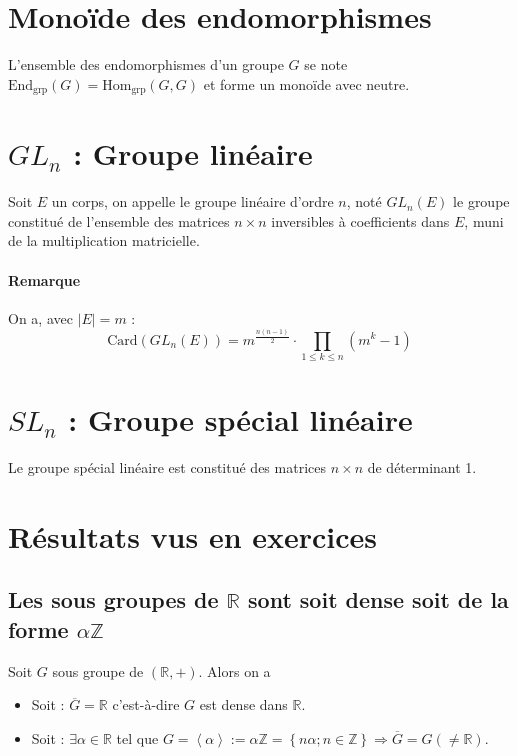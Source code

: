 \documentclass[a4paper,10pt]{report}
\newcommand{\grp}[1]{\left\langle #1 \right\rangle} %
\newcommand{\set}[1]{\left\lbrace #1 \right\rbrace } %
\newcommand{\IZ}{\mathbb{Z}} %
\newcommand{\IR}{\mathbb{R}} %
\newcommand{\so}{\Rightarrow}
\newcommand{\Card}[1]{\text{Card}\left( #1 \right)}
\begin{document}
  \section{Monoïde des endomorphismes}
   L'ensemble des endomorphismes d'un groupe $G$ se note
   $\text{End}_{\text{grp}}(G)=\text{Hom}_{\text{grp}}(G,G)$ et forme un monoïde
   avec neutre.

  \section{$GL_n$ : Groupe linéaire}
   Soit $E$ un corps, on appelle le groupe linéaire d'ordre $n$, noté $GL_n(E)$
   le groupe constitué de l'ensemble des matrices $n \times n$ inversibles à
   coefficients dans $E$, muni de la multiplication matricielle.

   \paragraph{Remarque} On a, avec $|E|=m$ : 
   $$\Card{GL_n(E)}=m^{\frac{n(n-1)}{2}}
   \cdot \prod_{1 \leq k \leq n} (m^k-1)$$

  \section{$SL_n$ : Groupe spécial linéaire}
   Le groupe spécial linéaire est constitué des matrices $n \times n$ de
   déterminant 1.

  \section{Résultats vus en exercices}
   \subsection{Les sous groupes de $\IR$ sont soit dense soit de la forme
   $\alpha \IZ$}
    Soit $G$ sous groupe de $(\IR, +)$. Alors on a
    \begin{itemize}
      \item Soit : $\overline{G} = \IR$ c'est-à-dire $G$ est dense dans $\IR$.
      \item Soit : $\exists \alpha \in \IR$ tel que $G=\grp{\alpha}:= \alpha
        \IZ=\set{n\alpha; n\in \IZ} \so \overline{G}=G(\neq \IR)$. 
    \end{itemize}
    \begin{comment}
      Preuve : 10/12/08 p 3
    \end{comment}
\end{document}
